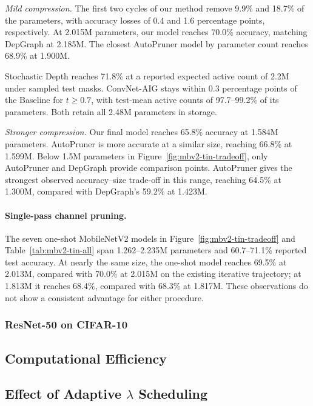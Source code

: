 \documentclass[sigplan,screen]{acmart}
\begin{document}
\emph{Mild compression.} The first two cycles of our method
remove 9.9\% and 18.7\% of the parameters, with accuracy
losses of 0.4 and 1.6 percentage points, respectively.
At 2.015M parameters, our model reaches 70.0\% accuracy,
matching DepGraph at 2.185M. The closest AutoPruner model
by parameter count reaches 68.9\% at 1.900M.

Stochastic Depth reaches 71.8\% at a reported expected active count
of 2.2M under sampled test masks. ConvNet-AIG stays
within 0.3 percentage points of the Baseline for $t\geq0.7$,
with test-mean active counts of 97.7--99.2\% of its parameters.
Both retain all 2.48M parameters in storage.

\emph{Stronger compression.} Our final model reaches 65.8\%
accuracy at 1.584M parameters. AutoPruner is more accurate
at a similar size, reaching 66.8\% at 1.599M.
Below 1.5M parameters in Figure~\ref{fig:mbv2-tin-tradeoff},
only AutoPruner and DepGraph provide comparison points.
 AutoPruner gives the strongest observed
accuracy--size trade-off in this range, reaching 64.5\%
at 1.300M, compared with DepGraph's 59.2\% at 1.423M.

\paragraph{Single-pass channel pruning.}
The seven one-shot MobileNetV2 models in
Figure~\ref{fig:mbv2-tin-tradeoff} and
Table~\ref{tab:mbv2-tin-all} span 1.262--2.235M
parameters and 60.7--71.1\% reported test accuracy. At nearly the
same size, the one-shot model reaches 69.5\% at 2.013M,
compared with 70.0\% at 2.015M on the existing iterative
trajectory; at 1.813M it reaches 68.4\%, compared with 68.3\%
at 1.817M. These observations do not show a consistent advantage
for either procedure.

\subsubsection{ResNet-50 on CIFAR-10}





\subsection{Computational Efficiency}
\subsection{Effect of Adaptive \texorpdfstring{$\lambda$}{lambda} Scheduling}
\end{document}
